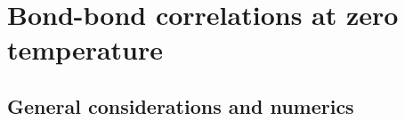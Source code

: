 %
%
\section[Bond-bond correlations at zero temperature]{Bond-bond correlations at zero temperature}
\label{section:chapter07_BondBondCorrelationsZeroTemperature}
%
%
\subsection{General considerations and numerics}
\label{section:chapter07_BondBondGeneral}
%
%
